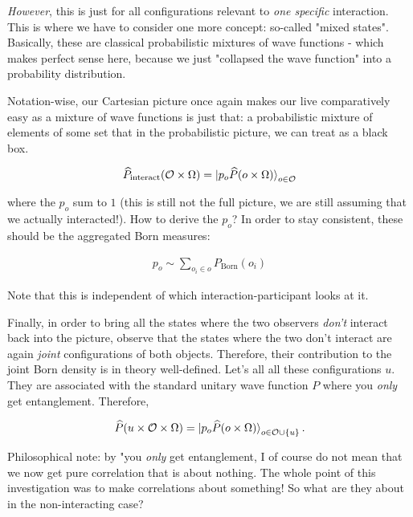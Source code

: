 \documentclass{article}
\begin{document}
\textit{However}, this is just for all configurations relevant to \textit{one specific} interaction. This is where we have to consider one more concept: so-called "mixed states". Basically, these are classical probabilistic mixtures of wave functions - which makes perfect sense here, because we just "collapsed the wave function" into a probability distribution.

Notation-wise, our Cartesian picture once again makes our live comparatively easy as a mixture of wave functions is just that: a probabilistic mixture of elements of some set that in the probabilistic picture, we can treat as a black box.

\begin{align*}
\widehat{P}_{\text{interact}}(\mathcal{O}\times\Omega) = \ket{p_o \widehat{P}(o\times\Omega)}_{o\in\mathcal{O}}
\end{align*}

where the $p_o$ sum to $1$ (this is still not the full picture, we are still assuming that we actually interacted!). How to derive the $p_o$? In order to stay consistent, these should be the aggregated Born measures:

\begin{align*}
p_o \sim \sum_{o_i\in o}P_{\text{Born}}(o_i)
\end{align*}

Note that this is independent of which interaction-participant looks at it.

Finally, in order to bring all the states where the two observers \textit{don't} interact back into the picture, observe that the states where the two don't interact are again \textit{joint} configurations of both objects. Therefore, their contribution to the joint Born density is in theory well-defined. Let's all all these configurations $u$. They are associated with the standard unitary wave function $P$ where you \textit{only} get entanglement. Therefore,

\begin{align*}
\widehat{P}(u\times\mathcal{O}\times\Omega) = \ket{p_o \widehat{P}(o\times\Omega)}_{o\in\mathcal{O}\cup \lbrace u\rbrace}.
\end{align*}

Philosophical note: by "you \textit{only} get entanglement, I of course do not mean that we now get pure correlation that is about nothing. The whole point of this investigation was to make correlations about something! So what are they about in the non-interacting case?
\end{document}
